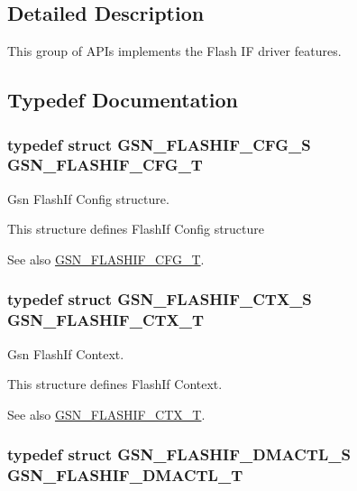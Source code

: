 \subsection{Detailed Description}
This group of APIs implements the Flash IF driver features. 

\subsection{Typedef Documentation}
\hypertarget{a00647_gaaf4a476f19c5d44c391a5e5dab872e9b}{
\subsubsection[{GSN\_\-FLASHIF\_\-CFG\_\-T}]{\setlength{\rightskip}{0pt plus 5cm}typedef struct {\bf GSN\_\-FLASHIF\_\-CFG\_\-S}  {\bf GSN\_\-FLASHIF\_\-CFG\_\-T}}}
\label{a00647_gaaf4a476f19c5d44c391a5e5dab872e9b}


Gsn FlashIf Config structure. 

This structure defines FlashIf Config structure

\begin{DoxySeeAlso}{See also}
\hyperlink{a00647_gaaf4a476f19c5d44c391a5e5dab872e9b}{GSN\_\-FLASHIF\_\-CFG\_\-T}. 
\end{DoxySeeAlso}
\hypertarget{a00647_gacef88670392e2c2c8f6cc45eab1ad658}{
\subsubsection[{GSN\_\-FLASHIF\_\-CTX\_\-T}]{\setlength{\rightskip}{0pt plus 5cm}typedef struct {\bf GSN\_\-FLASHIF\_\-CTX\_\-S}  {\bf GSN\_\-FLASHIF\_\-CTX\_\-T}}}
\label{a00647_gacef88670392e2c2c8f6cc45eab1ad658}


Gsn FlashIf Context. 

This structure defines FlashIf Context.

\begin{DoxySeeAlso}{See also}
\hyperlink{a00647_gacef88670392e2c2c8f6cc45eab1ad658}{GSN\_\-FLASHIF\_\-CTX\_\-T}. 
\end{DoxySeeAlso}
\hypertarget{a00647_ga3191e2eabef0c8e1b95922431d75565f}{
\subsubsection[{GSN\_\-FLASHIF\_\-DMACTL\_\-T}]{\setlength{\rightskip}{0pt plus 5cm}typedef struct {\bf GSN\_\-FLASHIF\_\-DMACTL\_\-S}  {\bf GSN\_\-FLASHIF\_\-DMACTL\_\-T}}}
\label{a00647_ga3191e2eabef0c8e1b95922431d75565f}


